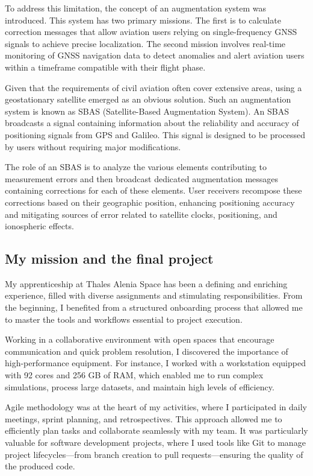 To address this limitation, the concept of an augmentation system was introduced. This system has two primary missions. The first is to calculate correction messages that allow aviation users relying on single-frequency GNSS signals to achieve precise localization. The second mission involves real-time monitoring of GNSS navigation data to detect anomalies and alert aviation users within a timeframe compatible with their flight phase.

Given that the requirements of civil aviation often cover extensive areas, using a geostationary satellite emerged as an obvious solution. Such an augmentation system is known as SBAS (Satellite-Based Augmentation System). An SBAS broadcasts a signal containing information about the reliability and accuracy of positioning signals from GPS and Galileo. This signal is designed to be processed by users without requiring major modifications.

The role of an SBAS is to analyze the various elements contributing to measurement errors and then broadcast dedicated augmentation messages containing corrections for each of these elements. User receivers recompose these corrections based on their geographic position, enhancing positioning accuracy and mitigating sources of error related to satellite clocks, positioning, and ionospheric effects.

\subsection{My mission and the final project}
 

My apprenticeship at Thales Alenia Space has been a defining and enriching experience, filled with diverse assignments and stimulating responsibilities. From the beginning, I benefited from a structured onboarding process that allowed me to master the tools and workflows essential to project execution.

Working in a collaborative environment with open spaces that encourage communication and quick problem resolution, I discovered the importance of high-performance equipment. For instance, I worked with a workstation equipped with 92 cores and 256 GB of RAM, which enabled me to run complex simulations, process large datasets, and maintain high levels of efficiency.

Agile methodology was at the heart of my activities, where I participated in daily meetings, sprint planning, and retrospectives. This approach allowed me to efficiently plan tasks and collaborate seamlessly with my team. It was particularly valuable for software development projects, where I used tools like Git to manage project lifecycles—from branch creation to pull requests—ensuring the quality of the produced code.

